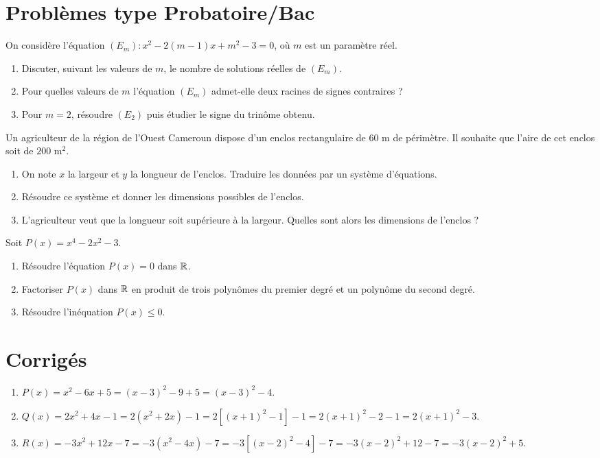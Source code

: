 \section{Problèmes type Probatoire/Bac}

On considère l'équation $(E_m) : x^2 - 2(m-1)x + m^2 - 3 = 0$, où $m$ est un paramètre réel.
\begin{enumerate}[label=\arabic*)]
  \item Discuter, suivant les valeurs de $m$, le nombre de solutions réelles de $(E_m)$.
  \item Pour quelles valeurs de $m$ l'équation $(E_m)$ admet-elle deux racines de signes contraires ?
  \item Pour $m = 2$, résoudre $(E_2)$ puis étudier le signe du trinôme obtenu.
\end{enumerate}

Un agriculteur de la région de l'Ouest Cameroun dispose d'un enclos rectangulaire de $60$ m de périmètre. Il souhaite que l'aire de cet enclos soit de $200$ m$^2$.
\begin{enumerate}[label=\arabic*)]
  \item On note $x$ la largeur et $y$ la longueur de l'enclos. Traduire les données par un système d'équations.
  \item Résoudre ce système et donner les dimensions possibles de l'enclos.
  \item L'agriculteur veut que la longueur soit supérieure à la largeur. Quelles sont alors les dimensions de l'enclos ?
\end{enumerate}

Soit $P(x) = x^4 - 2x^2 - 3$.
\begin{enumerate}[label=\arabic*)]
  \item Résoudre l'équation $P(x) = 0$ dans $\mathbb{R}$.
  \item Factoriser $P(x)$ dans $\mathbb{R}$ en produit de trois polynômes du premier degré et un polynôme du second degré.
  \item Résoudre l'inéquation $P(x) \leq 0$.
\end{enumerate}

\section{Corrigés}

\begin{enumerate}[label=\alph*)]
  \item $P(x) = x^2 - 6x + 5 = (x-3)^2 - 9 + 5 = (x-3)^2 - 4$.
  \item $Q(x) = 2x^2 + 4x - 1 = 2(x^2 + 2x) - 1 = 2[(x+1)^2 - 1] - 1 = 2(x+1)^2 - 2 - 1 = 2(x+1)^2 - 3$.
  \item $R(x) = -3x^2 + 12x - 7 = -3(x^2 - 4x) - 7 = -3[(x-2)^2 - 4] - 7 = -3(x-2)^2 + 12 - 7 = -3(x-2)^2 + 5$.
\end{enumerate}

